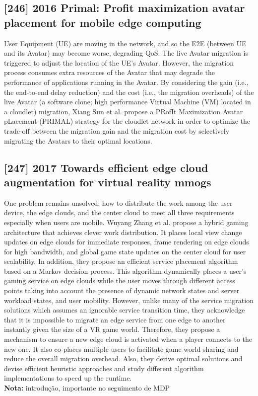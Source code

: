 \subsection{[246] 2016 Primal: Profit maximization avatar placement for mobile edge computing}
\label{subsec:paper15}
User Equipment (UE) are moving in the network, and so the E2E (between UE and its Avatar) may become worse, degrading QoS. The live Avatar migration is triggered to adjust the location of the UE’s Avatar. However, the migration process consumes extra resources of the Avatar that may degrade the performance of applications running in the Avatar. By considering the gain (i.e., the end-to-end delay reduction) and the cost (i.e., the migration overheads) of the live Avatar (a software clone; high performance Virtual Machine (VM) located in a cloudlet) migration, Xiang Sun et al. \cite{sun2016primal} propose a PRofIt Maximization Avatar pLacement (PRIMAL) strategy for the cloudlet network in order to optimize the trade-off between the migration gain and the migration cost by selectively migrating the Avatars to their optimal locations.

\subsection{[247] 2017 Towards efficient edge cloud augmentation for virtual reality mmogs}
\label{subsec:paper16}
One problem remains unsolved: how to distribute the work among the user device, the edge clouds, and the center cloud to meet all three requirements especially when users are mobile. Wuyang Zhang et al. \cite{zhang2017towards} propose a hybrid gaming architecture that achieves clever work distribution. It places local view change updates on edge clouds for immediate responses, frame rendering on edge clouds for high bandwidth, and global game state updates on the center cloud for user scalability. In addition, they propose an efficient service placement algorithm based on a Markov decision process. This algorithm dynamically places a user’s gaming service on edge clouds while the user moves through different access points taking into account the presence of dynamic network states and server workload states, and user mobility. However, unlike many of the service migration solutions which assumes an ignorable service transition time, they acknowledge that it is impossible to migrate an edge service from one edge to another instantly given the size of a VR game world. Therefore, they propose a mechanism to ensure a new edge cloud is activated when a player connects to the new one. It also co-places multiple users to facilitate game world sharing and reduce the overall migration overhead. Also, they derive optimal solutions and devise efficient heuristic approaches and study different algorithm implementations to speed up the runtime.\\
\textbf{Nota:} introdução, importante no seguimento de MDP

